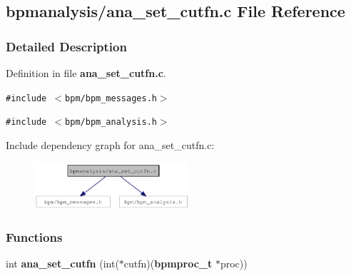 \subsection{bpmanalysis/ana\_\-set\_\-cutfn.c File Reference}
\label{ana__set__cutfn_8c}


\subsubsection{Detailed Description}


Definition in file {\bf ana\_\-set\_\-cutfn.c}.

{\tt \#include $<$bpm/bpm\_\-messages.h$>$}\par
{\tt \#include $<$bpm/bpm\_\-analysis.h$>$}\par


Include dependency graph for ana\_\-set\_\-cutfn.c:\nopagebreak
\begin{figure}[H]
\begin{center}
\leavevmode
\includegraphics[width=163pt]{ana__set__cutfn_8c__incl}
\end{center}
\end{figure}
\subsubsection*{Functions}
\begin{CompactItemize}
\item 
int {\bf ana\_\-set\_\-cutfn} (int($\ast$cutfn)({\bf bpmproc\_\-t} $\ast$proc))
\end{CompactItemize}
